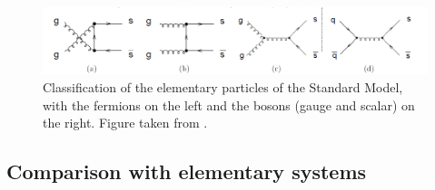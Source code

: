 \begin{figure}[h]
	\centering
	\includegraphics[width=\textwidth]{Figs/Chapter2/Screenshot_20220620_004959.png}
	\caption{Classification of the elementary particles of the Standard Model, with the fermions on the left and the bosons (gauge and scalar) on the right. Figure taken from \cite{missmjStandardModelElementary2019}.}
	\label{fig:StrangenessEnhancement}
\end{figure}


\subsection{Comparison with elementary systems}


    



